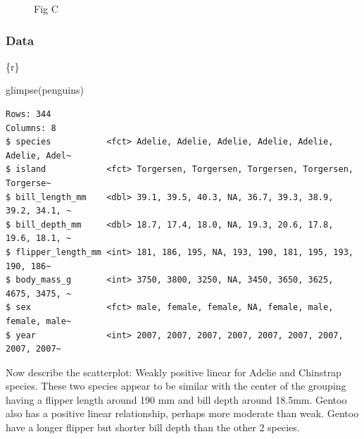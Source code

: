 \documentclass[
  letterpaper,
  DIV=11,
  numbers=noendperiod]{scrreprt}
\newenvironment{Shaded}{\begin{snugshade}}{\end{snugshade}}
\newcommand{\FunctionTok}[1]{\textcolor[rgb]{0.28,0.35,0.67}{#1}}
\newcommand{\InformationTok}[1]{\textcolor[rgb]{0.37,0.37,0.37}{#1}}
\newcommand{\NormalTok}[1]{\textcolor[rgb]{0.00,0.23,0.31}{#1}}
\begin{document}
\begin{tcolorbox}[enhanced jigsaw, breakable, colback=white, bottomrule=.15mm, leftrule=.75mm, colframe=quarto-callout-note-color-frame, arc=.35mm, rightrule=.15mm, toprule=.15mm, left=2mm, opacityback=0]
\begin{figure}[H]
{}

\caption{Fig C}

\end{figure}

\hypertarget{data-1}{%
\subsubsection*{Data}\label{data-1}}

\begin{Shaded}
\begin{Highlighting}[]
\InformationTok{\textasciigrave{}\textasciigrave{}\textasciigrave{}\{r\}}

\FunctionTok{glimpse}\NormalTok{(penguins)}
\InformationTok{\textasciigrave{}\textasciigrave{}\textasciigrave{}}
\end{Highlighting}
\end{Shaded}

\begin{verbatim}
Rows: 344
Columns: 8
$ species           <fct> Adelie, Adelie, Adelie, Adelie, Adelie, Adelie, Adel~
$ island            <fct> Torgersen, Torgersen, Torgersen, Torgersen, Torgerse~
$ bill_length_mm    <dbl> 39.1, 39.5, 40.3, NA, 36.7, 39.3, 38.9, 39.2, 34.1, ~
$ bill_depth_mm     <dbl> 18.7, 17.4, 18.0, NA, 19.3, 20.6, 17.8, 19.6, 18.1, ~
$ flipper_length_mm <int> 181, 186, 195, NA, 193, 190, 181, 195, 193, 190, 186~
$ body_mass_g       <int> 3750, 3800, 3250, NA, 3450, 3650, 3625, 4675, 3475, ~
$ sex               <fct> male, female, female, NA, female, male, female, male~
$ year              <int> 2007, 2007, 2007, 2007, 2007, 2007, 2007, 2007, 2007~
\end{verbatim}

\end{tcolorbox}

\begin{tcolorbox}[enhanced jigsaw, breakable, colback=white, bottomrule=.15mm, leftrule=.75mm, colframe=quarto-callout-important-color-frame, arc=.35mm, rightrule=.15mm, toprule=.15mm, left=2mm, opacityback=0]
Now describe the scatterplot: Weakly positive linear for Adelie and
Chinstrap species. These two species appear to be similar with the
center of the grouping having a flipper length around 190 mm and bill
depth around 18.5mm. Gentoo also has a positive linear relationship,
perhaps more moderate than weak. Gentoo have a longer flipper but
shorter bill depth than the other 2 species.
\end{tcolorbox}
\end{document}
